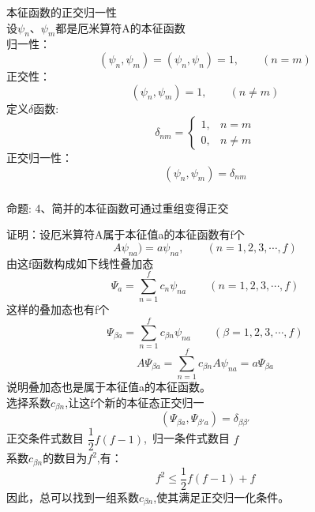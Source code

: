 \begin{frame} [allowframebreaks=]
    \frametitle{}
    \alert{本征函数的正交归一性}\\
    设$\psi_n$、$\psi_m$都是厄米算符A的本征函数\\
    归一性：
    \begin{equation*}
        (\psi_n, \psi_m)=(\psi_n, \psi_n)=1, \qquad (n=m)
    \end{equation*}  
    正交性：
    \begin{equation*}
        (\psi_n, \psi_m)=1, \qquad (n\neq m)
    \end{equation*}
    定义$\delta$函数:
    \begin{equation*}
        \delta_{n m}= 
        \begin{cases}1, & n=m \\ 
            0, & n \neq m
        \end{cases}
        \end{equation*}
    正交归一性：
    \begin{equation*}
        (\psi_n, \psi_m)=\delta_{nm}
    \end{equation*}
\end{frame} 

\begin{frame} [allowframebreaks=]
    \frametitle{}
    \begin{tcolorbox1}{命题:}
        4、简并的本征函数可通过重组变得正交
     \end{tcolorbox1}
    \alert{证明：}设厄米算符A属于本征值a的本征函数有f个
    \begin{equation*}
        A\psi_{na})=a\psi_{na}, \qquad (n=1,2,3,\cdots, f)
    \end{equation*}  
    由这f函数构成如下线性叠加态
    \begin{equation*}
        \Psi_a=\sum_{n=1}^{f} c_n \psi_{na} \qquad (n=1,2,3,\cdots, f)
    \end{equation*}
    这样的叠加态也有f个
    \begin{equation*}
        \Psi_{\beta a}=\sum_{n=1}^{f} c_{\beta n} \psi_{na} \qquad (\beta=1,2,3,\cdots, f)
    \end{equation*}
    \begin{equation*}
        A\Psi_{\beta a}=\sum_{n=1}^{f} c_{\beta n} A\psi_{na} =a \Psi_{\beta a}
    \end{equation*}
   说明叠加态也是属于本征值a的本征函数。\\
   选择系数$c_{\beta n}$,让这f个新的本征态正交归一
   \begin{equation*}
    (\Psi_{\beta a}, \Psi_{\beta' a})=\delta_{\beta\beta'}
    \end{equation*}
    正交条件式数目 $\dfrac{1}{2}f(f-1)$, 归一条件式数目 $f$\\
    系数$c_{\beta n}$的数目为$f^2$,有：$$ f^2\le \dfrac{1}{2}f(f-1)+f$$
    因此，总可以找到一组系数$c_{\beta n}$,使其满足正交归一化条件。
\end{frame} 

